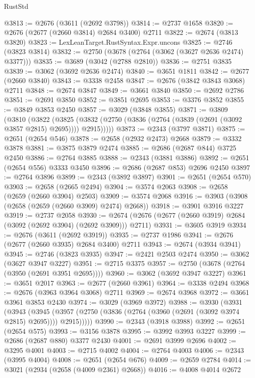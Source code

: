 \begin{lexlean}{RustStd}
\begin{coremodule}
{\begin{coremodule}
{{{{{{{{{{{{{{{{{{{{{{{{{{{{{{{{{{{{{{{{{{{{{{{{{{{{{{{@3813 := @2676 (@3611 (@2692 @3798))
@3814 := @2737 @1658
@3820 := @2676 (@2677 (@2660 @3814) @2684 @3400) @2711
@3822 := @2674 (@3813 @3820)
@3823 := LexLeanTarget.RustSyntax.Expr.uncons
@3825 := @2746 (@3823 @3814)
@3832 := @2750 (@3678 (@2764 (@3062 (@3627 @2636 @2474) @3377)))
@3835 := @3689 (@3042 (@2788 @2810))
@3836 := @2751 @3835
@3839 := @3062 (@3692 @2636 @2474)
@3840 := @3651 @1811
@3842 := @2677 (@2660 @3840)
@3843 := @3338 @2458
@3847 := @2676 (@3842 @3843 @3068) @2711
@3848 := @2674 @3847
@3849 := @3661 @3840
@3850 := @2692 @2786
@3851 := @2691 @3850
@3852 := @3851 @2695
@3853 := @3376 @3852
@3855 := @3849 @3853 @2450
@3857 := @3029 (@3848 @3855)
@3871 := @3809
    (@3810
      (@3822
        (@3825 (@3832 (@2750 (@3836 (@2764 (@3839 (@2691 (@3092 @3857 @2815) @2695)))) @2915)))))
@3873 := @2343 (@3797 @3871)
@3875 := @2651 (@2654 @546)
@3878 := @2658 (@2932 @2473) @2668
@3879 := @3332 @3878
@3881 := @3875 @3879 @2474
@3885 := @2686 (@2687 @844) @3725 @2450
@3886 := @2764 @3885
@3888 := @2343 (@3881 @3886)
@3892 := @2651 (@2654 @556) @3333 @3450
@3896 := @2686 (@2687 @853) @2696 @2450
@3897 := @2764 @3896
@3899 := @2343 (@3892 @3897)
@3901 := @2651 (@2654 @570)
@3903 := @2658 (@2665 @2494)
@3904 := @3574 @2063
@3908 := @2658 (@2659 (@2660 @3904) @2503)
@3909 := @3574 @2068
@3916 := @3903 (@3908 (@2658 (@2659 (@2660 @3909) @2474) @2668))
@3918 := @3901 @3916 @3227
@3919 := @2737 @2058
@3930 := @2674 (@2676 (@2677 (@2660 @3919) @2684 (@3092 (@2692 @3904) (@2692 @3909))) @2711)
@3931 := @3605 @3919
@3934 := @2676 (@3611 (@2692 @3919))
@3935 := @2737 @1986
@3941 := @2676 (@2677 (@2660 @3935) @2684 @3400) @2711
@3943 := @2674 (@3934 @3941)
@3945 := @2746 (@3823 @3935)
@3947 := @2421 @2503 @2474
@3950 := @3062 (@3627 @3947 @3227)
@3951 := @2715 @3375
@3957 := @2750 (@3678 (@2764 (@3950 (@2691 @3951 @2695))))
@3960 := @3062 (@3692 @3947 @3227)
@3961 := @3651 @2017
@3963 := @2677 (@2660 @3961)
@3964 := @3338 @2494
@3968 := @2676 (@3963 @3964 @3068) @2711
@3969 := @2674 @3968
@3972 := @3661 @3961 @3853 @2430
@3974 := @3029 (@3969 @3972)
@3988 := @3930
    (@3931
      (@3943
        (@3945 (@3957 (@2750 (@3836 (@2764 (@3960 (@2691 (@3092 @3974 @2815) @2695)))) @2915)))))
@3990 := @2343 (@3918 @3988)
@3992 := @2651 (@2654 @575)
@3993 := @3156 @3878
@3995 := @3992 @3993 @3227
@3999 := @2686 (@2687 @880) @3377 @2430
@4001 := @2691 @3999 @2696
@4002 := @3295 @4001
@4003 := @2715 @4002
@4004 := @2764 @4003
@4006 := @2343 (@3995 @4004)
@4008 := @2651 (@2654 @676)
@4009 := @2659 @2784
@4014 := @3021 (@2934 (@2658 (@4009 @2361) @2668))
@4016 := @4008 @4014 @2672
}}}}}}}}}}}}}}}}}}}}}}}}}}}}}}}}}}}}}}}}}}}}}}}}}}}}}}}
\end{coremodule}}
\end{coremodule}
\end{lexlean}
